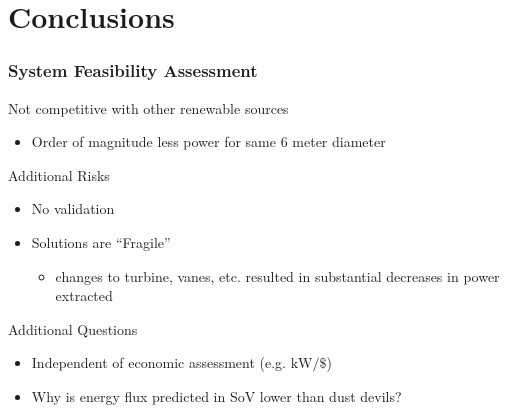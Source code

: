 \documentclass[mathserif]{beamer}
\begin{document}
\section{Conclusions}
\begin{frame}
 \frametitle{System Feasibility Assessment}

 \begin{block}{Not competitive with other renewable sources}
 \begin{itemize}
 \item Order of magnitude less power for same 6 meter diameter
 \end{itemize}
 \end{block}


 \begin{block}{Additional Risks}
 \begin{itemize}
 \item No validation
 \item Solutions are ``Fragile''
  \begin{itemize}
   \item changes to turbine, vanes, etc. resulted in substantial decreases
	 in power extracted 
  \end{itemize}
  \end{itemize}
 \end{block}

 \begin{block}{Additional Questions}
 \begin{itemize}
 \item Independent of economic assessment (e.g. $\text{kW}/\$$)
 \item Why is energy flux predicted in SoV lower than dust devils?
 \end{itemize}
 \end{block}


\end{frame}
\end{document}
